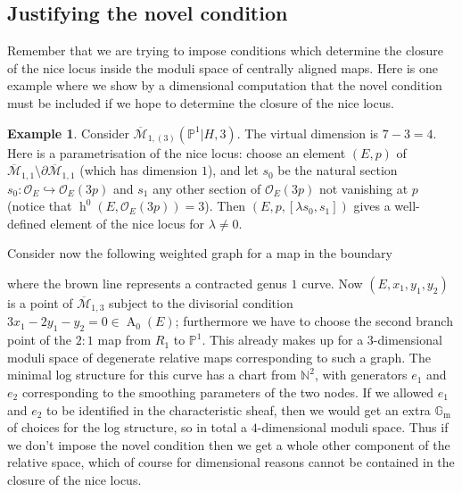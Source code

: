 \documentclass[11pt]{amsart}
\newcommand{\oM}{\overline{\mathcal{M}}}
\newcommand{\M}[4]{\overline{\mathcal{M}}_{#1,#2}(#3,#4)}
\newcommand{\PP}{\mathbb P}
\newcommand{\OO}{\mathcal{O}}
\newcommand{\Gm}{\mathbb{G}_{\text{m}}}
\newcommand{\Achow}{\operatorname{A}}
\newcommand{\h}{\operatorname{h}}
\theoremstyle{definition}
\theoremstyle{definition}
\newtheorem{example}[thm]{Example}
\begin{document}
\subsection{Justifying the novel condition}
Remember that we are trying to impose conditions which determine the closure of the nice locus inside the moduli space of centrally aligned maps. Here is one example where we show by a dimensional computation that the novel condition must be included if we hope to determine the closure of the nice locus.
\begin{example}
Consider $\M{1}{(3)}{\PP^1|H}{3}$. The virtual dimension is $7-3=4$. Here is a parametrisation of the nice locus: choose an element $(E,p)$ of $\oM_{1,1}\setminus\partial\oM_{1,1}$ (which has dimension $1$), and let $s_0$ be the natural section $s_0 \colon\OO_E\hookrightarrow\OO_E(3p)$ and $s_1$ any other section of $\OO_E(3p)$ not vanishing at $p$ (notice that $\h^0(E,\OO_E(3p))=3$). Then $(E,p,[\lambda s_0,s_1])$ gives a well-defined element of the nice locus for $\lambda \neq 0$.

Consider now the following weighted graph for a map in the boundary
\begin{center}
\end{center}
where the brown line represents a contracted genus $1$ curve. Now $(E,x_1,y_1,y_2)$ is a point of $\oM_{1,3}$ subject to the divisorial condition $3x_1-2y_1-y_2=0\in \Achow_0(E)$; furthermore we have to choose the second branch point of the $2\colon 1$ map from $R_1$ to $\PP^1$. This already makes up for a $3$-dimensional moduli space of degenerate relative maps corresponding to such a graph. The minimal log structure for this curve has a chart from $\mathbb N^2$, with generators $e_1$ and $e_2$ corresponding to the smoothing parameters of the two nodes. If we allowed $e_1$ and $e_2$ to be identified in the characteristic sheaf, then we would get an extra $\Gm$ of choices for the log structure, so in total a $4$-dimensional moduli space. Thus if we don't impose the novel condition then we get a whole other component of the relative space, which of course for dimensional reasons cannot be contained in the closure of the nice locus.
\end{example}
\end{document}
